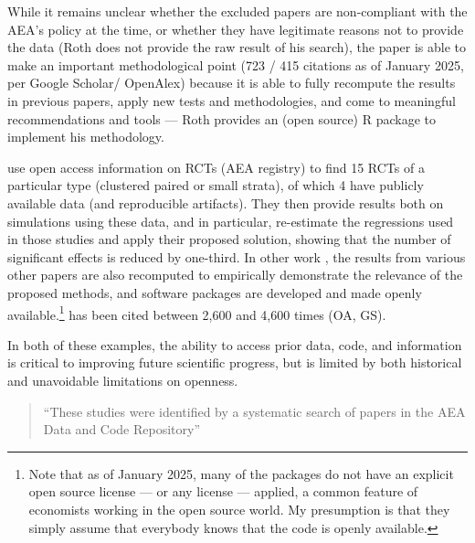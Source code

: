 \documentclass{article}
\begin{document}
While it remains unclear whether the excluded papers are non-compliant with the AEA's policy at the time, or whether they have legitimate reasons not to provide the data (Roth does not provide the raw result of his search), the paper is able to make an important methodological point (723 / 415 citations as of January 2025, per Google Scholar/ OpenAlex) because it is able to fully recompute the results in previous papers, apply new tests and methodologies, and come to meaningful recommendations and tools --- Roth provides an (open source) R package to implement his methodology.

\citet{de_chaisemartin_at_2024} use open access information on RCTs (AEA registry) to find 15 RCTs of a particular type (clustered paired or small strata), of which 4 have publicly available data (and reproducible artifacts). They then provide results both on simulations using these data, and in particular, re-estimate the regressions used in those studies and apply their proposed solution, showing that the number of significant effects is reduced by one-third. In other work \citep{de_chaisemartin_two-way_2020,de_chaisemartin_difference--differences_2024}, the results from various other papers are also recomputed to empirically demonstrate the relevance of the proposed methods, and software packages \citep[e.g.][]{de_chaisemartin_chaisemartinpackagesdid_multiplegt_dyn_2025} are developed and made openly available.\footnote{Note that as of January 2025, many of the packages do not have an explicit open source license --- or any license --- applied, a common feature of economists working in the open source world. My presumption is that they simply assume that everybody knows that the code is openly available.} \citet{de_chaisemartin_two-way_2020} has been cited between 2,600 and 4,600 times (OA, GS).


In both of these examples, the ability to access prior data, code, and information is critical to improving future scientific progress, but is limited by both historical and unavoidable limitations on openness.


%
\begin{quote}
    ``These studies were identified by a systematic search of papers in the AEA Data and Code Repository''
\end{quote}
\end{document}
